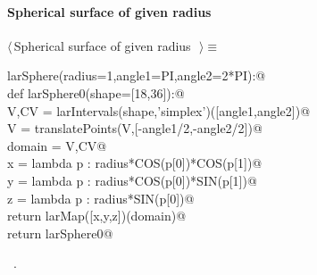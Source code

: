 \documentclass[11pt,oneside]{article}	%
\begin{document}
\paragraph{Spherical surface of given radius}
\begin{flushleft} \small \label{scrap12}
$\langle\,$Spherical surface of given radius\nobreak\ {\footnotesize {}}$\,\rangle\equiv$
\vspace{-1ex}
\begin{list}{}{} \item
\mbox{}\verb@def larSphere(radius=1,angle1=PI,angle2=2*PI):@\\
\mbox{}\verb@   def larSphere0(shape=[18,36]):@\\
\mbox{}\verb@      V,CV = larIntervals(shape,'simplex')([angle1,angle2])@\\
\mbox{}\verb@      V = translatePoints(V,[-angle1/2,-angle2/2])@\\
\mbox{}\verb@      domain = V,CV@\\
\mbox{}\verb@      x = lambda p : radius*COS(p[0])*COS(p[1])@\\
\mbox{}\verb@      y = lambda p : radius*COS(p[0])*SIN(p[1])@\\
\mbox{}\verb@      z = lambda p : radius*SIN(p[0])@\\
\mbox{}\verb@      return larMap([x,y,z])(domain)@\\
\mbox{}\verb@   return larSphere0@\\
\mbox{}\verb@@{\NWsep}
\end{list}
\vspace{-1ex}
\footnotesize\addtolength{\baselineskip}{-1ex}
\begin{list}{}{\setlength{\itemsep}{-\parsep}\setlength{\itemindent}{-\leftmargin}}
\item \NWtxtMacroRefIn\ .
\end{list}
\end{flushleft}
\end{document}
